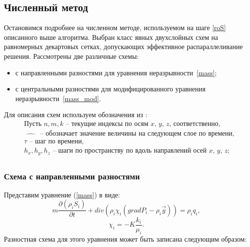 \subsection{Численный метод}
Остановимся подробнее на численном методе, используемом на шаге \ref{roS}
описанного выше алгоритма. Выбран класс явных двухслойных схем
на равномерных декартовых сетках,
допускающих эффективное распараллеливание решения.
Рассмотрены две различные схемы:
\begin{itemize}
\item с направленными разностями для уравнения неразрывности~\ref{mass};
\item с центральными разностями для модифицированного уравнения неразрывности~\ref{mass_mod}.
\end{itemize}
Для описания схем используем обозначения из \cite{Kalitkin}:
\begin{equation*}
  \begin{aligned}
    &\text{Пусть } n, m, k \text{ -- текущие индексы по осям $x$, $y$, $z$, соответственно,}\\
    &\widehat{\qquad} \text{ -- обозначает значение величины на следующем слое по времени,}\\
    &\tau \text{ -- шаг по времени,}\\
    &h_x, h_y, h_z \text{ -- шаги по пространству по 
    вдоль направлений осей $x$, $y$, $z$};\\
  \end{aligned}
\end{equation*}


\subsubsection*{Схема с направленными разностями}
Представим уравнение (\ref{mass}) в виде:
 \begin{equation}
 	 m \frac{\partial (\rho_i S_i)}{\partial t}+ div(\rho_i \chi_i (grad P_i - {\rho}_i\overrightarrow{g})) = \rho_i q_i,
 \end{equation}
 $$\chi_i=-K\frac{k_i}{\mu_i}.$$
Разностная схема для этого уравнения может быть записана следующим
образом:

